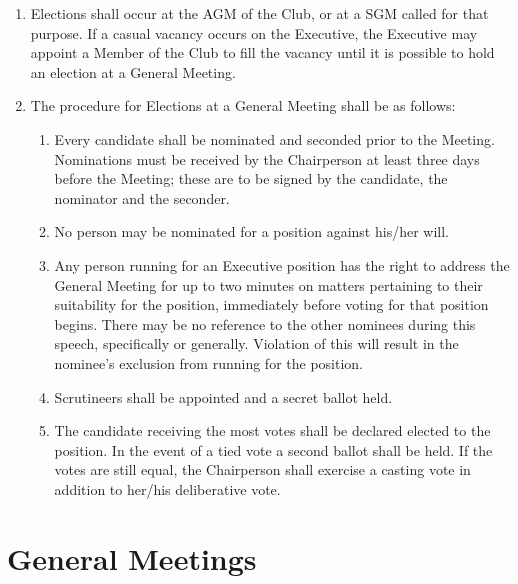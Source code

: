 \documentclass[a4paper]{article}
\begin{document}
	\begin{enumerate}
		\item Elections shall occur at the \ac{AGM} of the Club, or at a \ac{SGM} called for that purpose.
		If a casual vacancy occurs on the Executive, the Executive may appoint a Member of the Club to fill the vacancy until it is possible to hold an election at a General Meeting.
		
		\item The procedure for Elections at a General Meeting shall be as follows:
		\begin{enumerate}
			\item Every candidate shall be nominated and seconded prior to the Meeting. Nominations must be received by the Chairperson at least three days before the Meeting; these are to be signed by the candidate, the nominator and the seconder.
			
			\item No person may be nominated for a position against his/her will.
			
			\item Any person running for an Executive position has the right to address the General Meeting for up to two minutes on matters pertaining to their suitability for the position, immediately before voting for that position begins.
			There may be no reference to the other nominees during this speech, specifically or generally.
			Violation of this will result in the nominee's exclusion from running for the position.
			
			\item Scrutineers shall be appointed and a secret ballot held.
			
			\item The candidate receiving the most votes shall be declared elected to the position.
			In the event of a tied vote a second ballot shall be held.
			If the votes are still equal, the Chairperson shall exercise a casting vote in addition to her/his deliberative vote.
		\end{enumerate}
	\end{enumerate}
	
	\section{General Meetings}
	
\end{document}
